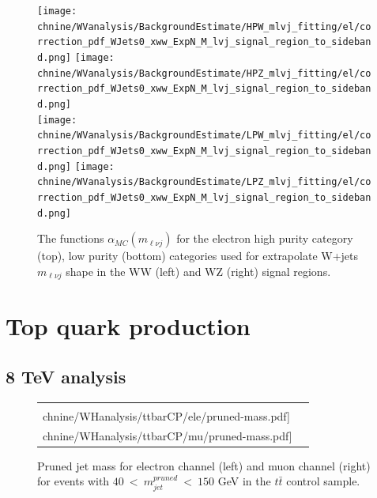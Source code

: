 \begin{figure}[htbp]
\centering
\texttt{[image: \\chnine/WVanalysis/BackgroundEstimate/HPW\_mlvj\_fitting/el/correction\_pdf\_WJets0\_xww\_ExpN\_M\_lvj\_signal\_region\_to\_sideband.png]}
\texttt{[image: \\chnine/WVanalysis/BackgroundEstimate/HPZ\_mlvj\_fitting/el/correction\_pdf\_WJets0\_xww\_ExpN\_M\_lvj\_signal\_region\_to\_sideband.png]}\\
\texttt{[image: \\chnine/WVanalysis/BackgroundEstimate/LPW\_mlvj\_fitting/el/correction\_pdf\_WJets0\_xww\_ExpN\_M\_lvj\_signal\_region\_to\_sideband.png]}
\texttt{[image: \\chnine/WVanalysis/BackgroundEstimate/LPZ\_mlvj\_fitting/el/correction\_pdf\_WJets0\_xww\_ExpN\_M\_lvj\_signal\_region\_to\_sideband.png]}\\
\caption{The functions $\alpha_{MC}(m_{\ell\nu j})$ for the electron high purity category (top), low purity (bottom) categories
used for extrapolate W+jets $m_{\ell\nu j}$ shape in the WW (left) and WZ (right) signal regions.}
\label{fig:alphas_VW_2}
\end{figure}


\clearpage
\section{Top quark production}

\subsection*{8 TeV analysis}

\begin{figure}[bh!p]
\centering
\begin{tabular}{lr}
\texttt{[image: \\chnine/WHanalysis/ttbarCP/ele/pruned-mass.pdf]} &
\texttt{[image: \\chnine/WHanalysis/ttbarCP/mu/pruned-mass.pdf]} \\
\end{tabular}
\caption{Pruned jet mass for electron channel (left) and muon channel (right) for events with
$40~<~m_{jet}^{pruned}~<~150$ GeV in the $t\bar{t}$ control sample.}
\label{fig:ttbarCP1}
\end{figure}

